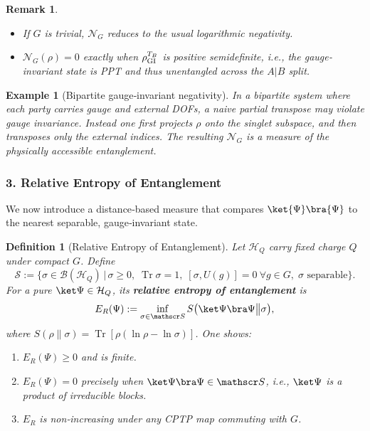 \documentclass[12pt,a4paper]{article}
\newtheorem{definition}{Definition}
\newtheorem{remark}{Remark}
\newtheorem{example}{Example}
\begin{document}
\begin{remark}
	\leavevmode
	\begin{itemize}
		\item If $G$ is trivial, $\mathcal N_G$ reduces to the usual logarithmic negativity.
		\item $\mathcal N_G(\rho)=0$ exactly when $\rho_{\rm GI}^{T_B}$ is positive semidefinite, i.e., the gauge‐invariant state is PPT and thus unentangled across the $A|B$ split.
	\end{itemize}
\end{remark}


\begin{example}[Bipartite gauge‐invariant negativity]
	In a bipartite system where each party carries gauge and external DOFs, a naive partial transpose may violate gauge invariance.
	Instead one first projects $\rho$ onto the singlet subspace, and then transposes only the external indices.
	The resulting $\mathcal N_G$ is a measure of the physically accessible entanglement.
\end{example}



\subsubsection*{3. Relative Entropy of Entanglement \cite{VedralPlenio1998,Umegaki1962}}

We now introduce a distance‐based measure that compares $\ket{\Psi}\bra{\Psi}$ to the nearest separable, gauge‐invariant state.

\begin{definition}[Relative Entropy of Entanglement]
	Let $\mathcal H_Q$ carry fixed charge $Q$ under compact $G$.  Define
	\[
	\mathscr S
	:=
	\bigl\{
	\sigma\in\mathcal B(\mathcal H_Q)\,\big|\,
	\sigma\ge0,\;\operatorname{Tr}\sigma=1,\;
	[\sigma,U(g)]=0~\forall g\in G,\;
	\sigma\text{ separable}
	\bigr\}.
	\]
	For a pure $\ket\Psi\in\mathcal H_Q$, its \textbf{relative entropy of entanglement} is
	\[
	E_R(\Psi)
	:=\inf_{\sigma\in\mathscr S}
	S\bigl(\ket\Psi\bra\Psi\big\|\sigma\bigr),
	\]
	where $S(\rho\|\sigma)=\operatorname{Tr}[\rho(\ln\rho-\ln\sigma)]$.
	One shows:
	\begin{enumerate}
		\item $E_R(\Psi)\ge0$ and is finite.
		\item $E_R(\Psi)=0$ precisely when $\ket\Psi\bra\Psi\in\mathscr S$, i.e., $\ket\Psi$ is a product of irreducible blocks.
		\item $E_R$ is non‐increasing under any CPTP map commuting with $G$.
	\end{enumerate}
\end{definition}
\end{document}
